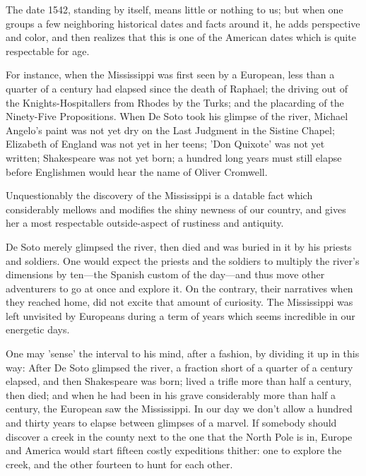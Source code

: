 \documentclass[../interior-demo.tex]{subfiles}
\begin{document}
The date 1542, standing by itself, means little or nothing to us; but
when one groups a few neighboring historical dates and facts around it,
he adds perspective and color, and then realizes that this is one of the
American dates which is quite respectable for age.

For instance, when the Mississippi was first seen by a European, less
than a quarter of a century had elapsed since the death of Raphael;
the driving out of the Knights-Hospitallers from Rhodes by
the Turks; and the placarding of the Ninety-Five Propositions.
When De Soto took his glimpse of the river,
Michael Angelo's paint was not yet dry on the Last
Judgment in the Sistine Chapel; Elizabeth of England was not yet in her teens;
'Don Quixote' was not yet written; Shakespeare was not yet born;
a hundred long years must
still elapse before Englishmen would hear the name of Oliver Cromwell.

Unquestionably the discovery of the Mississippi is a datable fact which
considerably mellows and modifies the shiny newness of our country, and
gives her a most respectable outside-aspect of rustiness and antiquity.

De Soto merely glimpsed the river, then died and was buried in it by his
priests and soldiers. One would expect the priests and the soldiers
to multiply the river's dimensions by ten---the Spanish custom of the
day---and thus move other adventurers to go at once and explore it. On
the contrary, their narratives when they reached home, did not excite
that amount of curiosity. The Mississippi was left unvisited by Europeans
during a term of years which seems incredible in our energetic days.

One may 'sense' the interval to his mind, after a fashion, by dividing it
up in this way: After De Soto glimpsed the river, a fraction short of
a quarter of a century elapsed, and then Shakespeare was born; lived a
trifle more than half a century, then died; and when he had been in his
grave considerably more than half a century, the  European saw
the Mississippi. In our day we don't allow a hundred and thirty years to
elapse between glimpses of a marvel. If somebody should discover a creek
in the county next to the one that the North Pole is in, Europe and
America would start fifteen costly expeditions thither: one to explore
the creek, and the other fourteen to hunt for each other.
\end{document}
